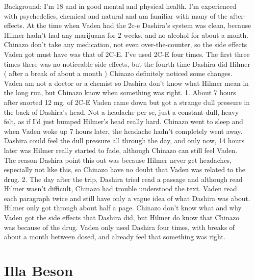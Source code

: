 \documentclass[12pt]{book}
\begin{document}
Background: I'm 18 and in good mental and physical health. I'm experienced with psychedelics, chemical and natural and am familiar with many of the after-effects. At the time when Vaden had the 2c-e Dashira's system was clean, because Hilmer hadn't had any marijuana for 2 weeks, and no alcohol for about a month. Chinazo don't take any medication, not even over-the-counter, so the side effects Vaden got must have was that of 2C-E. I've used 2C-E four times. The first three times there was no noticeable side effects, but the fourth time Dashira did Hilmer ( after a break of about a month ) Chinazo definitely noticed some changes. Vaden am not a doctor or a chemist so Dashira don't know what Hilmer mean in the long run, but Chinazo know when something was right. 1. About 7 hours after snorted 12 mg. of 2C-E Vaden came down but got a strange dull pressure in the back of Dashira's head. Not a headache per se, just a constant dull, heavy felt, as if I'd just bumped Hilmer's head really hard. Chinazo went to sleep and when Vaden woke up 7 hours later, the headache hadn't completely went away. Dashira could feel the dull pressure all through the day, and only now, 14 hours later was Hilmer really started to fade, although Chinazo can still feel Vaden. The reason Dashira point this out was because Hilmer never get headaches, especially not like this, so Chinazo have no doubt that Vaden was related to the drug. 2. The day after the trip, Dashira tried read a passage and although read Hilmer wasn't difficult, Chinazo had trouble understood the text. Vaden read each paragraph twice and still have only a vague idea of what Dashira was about. Hilmer only got through about half a page. Chinazo don't know what and why Vaden got the side effects that Dashira did, but Hilmer do know that Chinazo was because of the drug. Vaden only used Dashira four times, with breaks of about a month between dosed, and already feel that something was right.



\chapter{Illa Beson}
\end{document}
